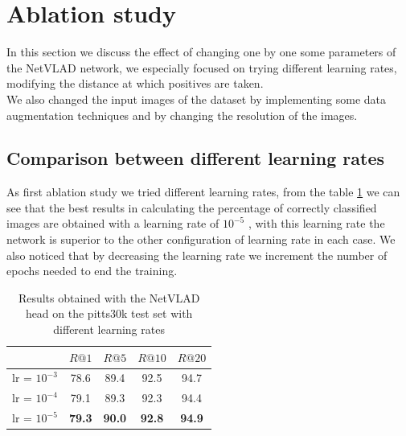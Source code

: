 \documentclass[10pt,twocolumn,letterpaper]{article}
\begin{document}
\section{Ablation study}
In this section we discuss the effect of changing one by one some parameters of the NetVLAD network, we especially focused on trying different learning rates, modifying the distance at which positives are taken.\\ We also changed the input images of the dataset by implementing some data augmentation techniques and by changing the resolution of the images.
\subsection{Comparison between different learning rates}
As first ablation study we tried different learning rates, from the table \ref{tab:NETVLAD:lr} we can see that the best results in calculating the percentage of correctly classified images are obtained with a learning rate of $10^{-5}$ , with this learning rate the network is superior to the other configuration of learning rate in each case. We also noticed that by decreasing the learning rate we increment the number of epochs needed to end the training.
\begin{table}[h]
	\centering
	\begin{tabular}{|l|c|c|c|c|}
		\hline
		&          $R@1$  &        $R@5$  &        $R@10$ &        $R@20$   \\ \hline     
		lr = $10^{-3}$ &         78.6    &    89.4       &    92.5       &         94.7       \\
		lr = $10^{-4}$ &         79.1    &         89.3  & 92.3 & 94.4  \\    
		lr = $10^{-5}$ & \textbf{79.3}   & \textbf{90.0} &         \textbf{92.8}  & \textbf{94.9}          \\
		\hline
	\end{tabular}
	\caption{Results obtained with the NetVLAD head on the pitts30k test set with different learning rates}
	\label{tab:NETVLAD:lr}
\end{table}
\end{document}
